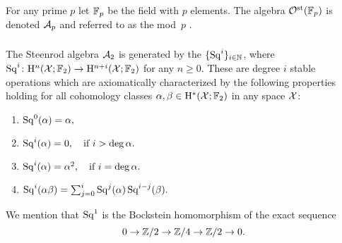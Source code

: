 For any prime $p$ let \({\mathbb{F}_p}\) be the field with \(p\) elements.
The algebra $\mathcal{O}^{\mathrm{st}}({\mathbb{F}_p})$ is denoted $\mathcal{A}_p$ and referred to as the mod~$p$ .

%

\subsubsection{}

The Steenrod algebra $\mathcal{A}_2$ is generated by the  $\{\operatorname{Sq}^i\}_{i \in \mathbb{N}}$, where $\operatorname{Sq}^i \colon \mathrm{H}^n(\mathcal{X}; {\mathbb{F}_2}) \to \mathrm{H}^{n+i}(\mathcal{X}; {\mathbb{F}_2})$ for any $n\geq 0$.
These are degree $i$ stable operations which are axiomatically characterized by the following properties holding for all cohomology classes $\alpha,\beta \in \mathrm{H}^*(\mathcal{X}; {\mathbb{F}_2})$ in any space $\mathcal{X}$:
\begin{enumerate}
	\item \(\operatorname{Sq}^0(\alpha) = \alpha,\)
	\item \(\operatorname{Sq}^i(\alpha) = 0, \quad \text{if } i > \deg\alpha.\)
	\item \(\operatorname{Sq}^i(\alpha) = \alpha^2, \quad \text{if } i = \deg\alpha.\)
	\item \(\operatorname{Sq}^i(\alpha \beta) = \textstyle\sum_{j=0}^{i} \operatorname{Sq}^j(\alpha) \operatorname{Sq}^{i-j}(\beta).\)
\end{enumerate}
We mention that $\operatorname{Sq}^1$ is the Bockstein homomorphism of the exact sequence
\[
0 \to \mathbb{Z}/2 \to \mathbb{Z}/4 \to \mathbb{Z}/2 \to 0.
\]

